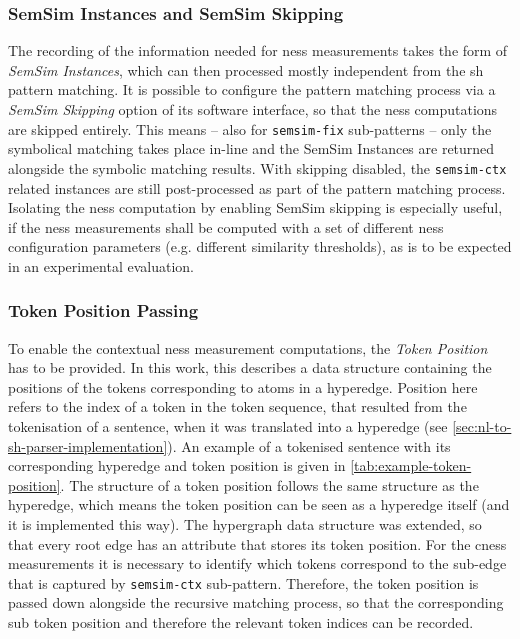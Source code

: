 \documentclass[11pt]{scrreprt}
\begin{document}
\subsubsection{SemSim Instances and SemSim Skipping}
The recording of the information needed for \gls{ness} measurements takes the form of \textit{SemSim Instances}, which can then processed mostly independent from the \gls{sh} pattern matching.  
It is possible to configure the pattern matching process via a \textit{SemSim Skipping} option of its software interface, so that the \gls{ness} computations are skipped entirely. This means -- also for \texttt{semsim-fix} sub-patterns -- only the symbolical matching takes place in-line and the SemSim Instances are returned alongside the symbolic matching results. With skipping disabled, the \texttt{semsim-ctx} related instances are still post-processed as part of the pattern matching process. Isolating the \gls{ness} computation by enabling SemSim skipping is especially useful, if the \gls{ness} measurements shall be computed with a set of different \gls{ness} configuration parameters (e.g. different similarity thresholds), as is to be expected in an experimental evaluation.

\subsubsection{Token Position Passing}
To enable the contextual \gls{ness} measurement computations, the \textit{Token Position} has to be provided. In this work, this describes a data structure containing the positions of the tokens corresponding to atoms in a hyperedge. Position here refers to the index of a token in the token sequence, that resulted from the tokenisation of a sentence, when it was translated into a hyperedge (see \cref{sec:nl-to-sh-parser-implementation}). An example of a tokenised sentence with its corresponding hyperedge and token position is given in \cref{tab:example-token-position}. 
The structure of a token position follows the same structure as the hyperedge, which means the token position can be seen as a hyperedge itself (and it is implemented this way). The hypergraph data structure was extended, so that every root edge has an attribute that stores its token position. For the \gls{cness} measurements it is necessary to identify which tokens correspond to the sub-edge that is captured by \texttt{semsim-ctx} sub-pattern. Therefore, the token position is passed down alongside the recursive matching process, so that the corresponding sub token position and therefore the relevant token indices can be recorded. 
\end{document}
